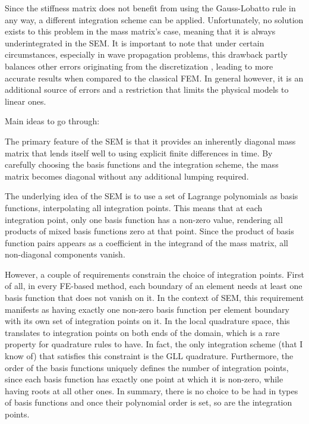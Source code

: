 Since the stiffness matrix does not benefit from using the Gauss-Lobatto rule in any way, a different integration scheme can be applied. Unfortunately, no solution exists to this problem in the mass matrix's case, meaning that it is always underintegrated in the SEM. It is important to note that under certain circumstances, especially in wave propagation problems, this drawback partly balances other errors originating from the discretization \cite{Ainsworth2010}, leading to more accurate results when compared to the classical FEM. In general however, it is an additional source of errors and a restriction that limits the physical models to linear ones.

Main ideas to go through:

The primary feature of the SEM is that it provides an inherently diagonal mass matrix that
lends itself well to using explicit finite differences in time. By carefully choosing the
basis functions and the integration scheme, the mass matrix becomes diagonal without any
additional lumping required.

The underlying idea of the SEM is to use a set of Lagrange polynomials as basis functions,
interpolating all integration points.
This means that at each integration point, only one
basis function has a non-zero value, rendering all products of mixed basis functions zero
at that point. Since the product of basis function pairs appears as a coefficient in the
integrand of the mass matrix, all non-diagonal components vanish.

However, a couple of requirements constrain the choice of integration points. First of all,
in every FE-based method, each boundary of an element needs at least one basis function that does not vanish on it.
In the context of SEM, this requirement manifests as having exactly one non-zero basis function per
element boundary with its own set of integration points on it. In the local quadrature
space, this translates to integration points on both ends of the domain, which is a rare property
for quadrature rules to have. In fact, the only integration scheme (that I know of) that
satisfies this constraint is the GLL quadrature. Furthermore, the order of the basis functions
uniquely defines the number of integration points, since each basis function has exactly
one point at which it is non-zero, while having roots at all other ones. In summary, there is
no choice to be had in types of basis functions and once their polynomial order is set, so are the
integration points.

